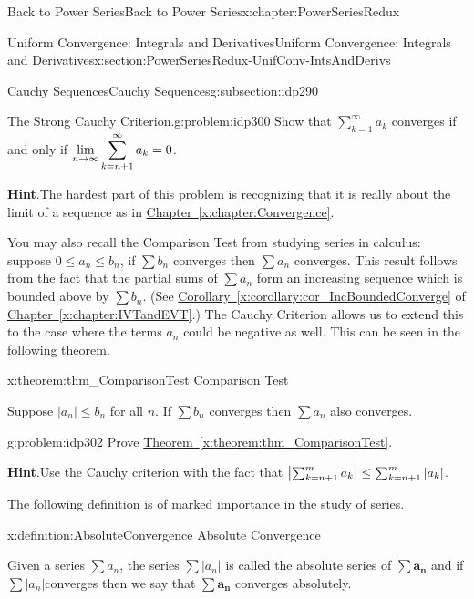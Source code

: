\begin{chapterptx}{Back to Power Series}{}{Back to Power Series}{}{}{x:chapter:PowerSeriesRedux}
\begin{sectionptx}{Uniform Convergence: Integrals and Derivatives}{}{Uniform Convergence: Integrals and Derivatives}{}{}{x:section:PowerSeriesRedux-UnifConv-IntsAndDerivs}
\begin{subsectionptx}{Cauchy Sequences}{}{Cauchy Sequences}{}{}{g:subsection:idp290}
			\begin{problem}{The Strong Cauchy Criterion.}{g:problem:idp300}%
				 Show that \(\displaystyle\sum_{k=1}^\infty a_k\) converges if and only if \({\displaystyle\lim_{n\rightarrow \infty}\sum_{k=n+1}^\infty a_k}=0\).%
				\par\smallskip%
				\noindent\textbf{\blocktitlefont Hint}.\hypertarget{g:hint:idp301}{}\quad{}The hardest part of this problem is recognizing that it is really about the limit of a sequence as in \hyperref[x:chapter:Convergence]{Chapter~{\xreffont\ref{x:chapter:Convergence}}}.%
			\end{problem}
			You may also recall the Comparison Test from studying series in calculus: suppose \(0\leq a_n\leq b_n\), if \(\sum b_n\) converges then \(\sum a_n\) converges. This result follows from the fact that the partial sums of \(\sum a_n\) form an increasing sequence which is bounded above by \(\sum b_n\). (See \hyperref[x:corollary:cor_IncBoundedConverge]{Corollary~{\xreffont\ref{x:corollary:cor_IncBoundedConverge}}} of \hyperref[x:chapter:IVTandEVT]{Chapter~{\xreffont\ref{x:chapter:IVTandEVT}}}.) The Cauchy Criterion allows us to extend this to the case where the terms \(a_n\) could be negative as well. This can be seen in the following theorem.%
			\begin{theorem}{}{}{x:theorem:thm_ComparisonTest}%
				\alert{Comparison Test}%
				\par
				 Suppose \(|a_n|\leq b_n\) for all \(n\). If \(\sum b_n\) converges then \(\sum a_n\) also converges.%
			\end{theorem}
			\begin{problem}{}{g:problem:idp302}%
				Prove \hyperref[x:theorem:thm_ComparisonTest]{Theorem~{\xreffont\ref{x:theorem:thm_ComparisonTest}}}.%
				\par\smallskip%
				\noindent\textbf{\blocktitlefont Hint}.\hypertarget{g:hint:idp303}{}\quad{}Use the Cauchy criterion with the fact that \(\left|\sum_{k=n+1}^ma_k\right|\leq\sum_{k=n+1}^m\left|a_k\right|\).%
			\end{problem}
			The following definition is of marked importance in the study of series.%
			\begin{definition}{}{x:definition:AbsoluteConvergence}%
				\alert{Absolute Convergence}%
				\par
				 Given a series \(\sum a_n\), the series \(\sum|a_n|\) is called the \textbraceleft{}absolute series\textbraceright{} of \(\sum\boldsymbol{a}_{\boldsymbol{n}}\) and if \(\sum|a_n|\)converges then we say that \(\sum\boldsymbol{a}_{\boldsymbol{n}}\) converges absolutely.%

\end{definition}
\end{subsectionptx}
\end{sectionptx}
\end{chapterptx}
